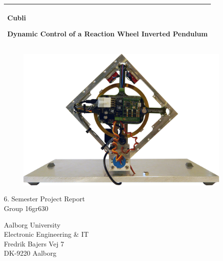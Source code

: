 %
\begin{titlepage}
  \addtolength{\hoffset}{0.5\evensidemargin-0.5\oddsidemargin} %
  \noindent%
  \begin{tabular}{@{}p{\textwidth}@{}}
    \toprule[2pt]
    \midrule
    \vspace{0.2cm}
    \begin{center}
    \Huge{\textbf{
      Cubli %
    }}
    \end{center}
    \begin{center}
      \Large{
      Dynamic Control of a Reaction Wheel Inverted Pendulum
      }
    \end{center}
    \vspace{0.2cm}\\
    \midrule
    \toprule[2pt]
  \end{tabular}
   \vspace{0.55 cm}
  \begin{figure}[!ht]
\centering
\includegraphics[width=0.95\textwidth]{figures/Cubli-1}
\label{fig:forside}
\end{figure}
  \vspace{0.6 cm}
  \begin{center}
    {\large
      6. Semester Project Report %
    }\\
    \vspace{0.2cm}
    {\Large
      Group 16gr630%
    }
  \end{center}
  \begin{center}
  Aalborg University\\
  Electronic Engineering \& IT\\
  Fredrik Bajers Vej 7\\
  DK-9220 Aalborg
  \end{center}
\end{titlepage}

\clearpage
